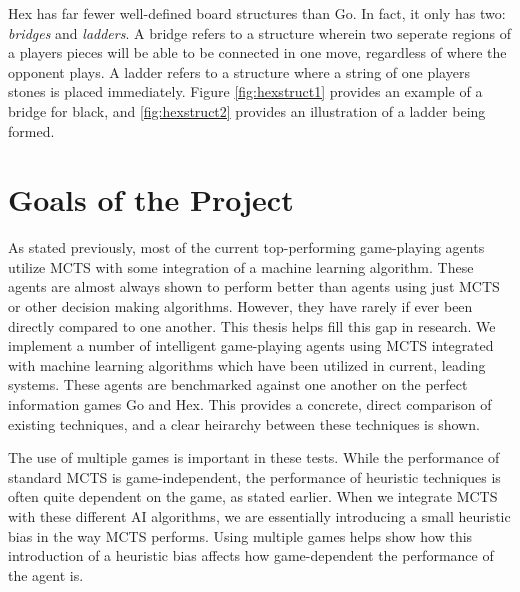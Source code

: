 Hex has far fewer well-defined board structures than Go.  In fact, it only has two: \textit{bridges} and \textit{ladders}.  A bridge refers to a structure wherein two seperate regions of a players pieces will be able to be connected in one move, regardless of where the opponent plays.  A ladder refers to a structure where a string of one players stones is placed immediately.  Figure \ref{fig:hexstruct1} provides an example of a bridge for black, and \ref{fig:hexstruct2} provides an illustration of a ladder being formed.

\section{Goals of the Project}\label{sec:goals}
As stated previously, most of the current top-performing game-playing agents utilize MCTS with some integration of a machine learning algorithm.  These agents are almost always shown to perform better than agents using just MCTS or other decision making algorithms.  However, they have rarely if ever been directly compared to one another.  This thesis helps fill this gap in research.  We implement a number of intelligent game-playing agents using MCTS integrated with machine learning algorithms which have been utilized in current, leading systems. These agents are benchmarked against one another on the perfect information games Go and Hex.  This provides a concrete, direct comparison of existing techniques, and a clear heirarchy between these techniques is shown.

The use of multiple games is important in these tests.  While the performance of standard MCTS is game-independent, the performance of heuristic techniques is often quite dependent on the game, as stated earlier.  When we integrate MCTS with these different AI algorithms, we are essentially introducing a small heuristic bias in the way MCTS performs.  Using multiple games helps show how this introduction of a heuristic bias affects how game-dependent the performance of the agent is.


